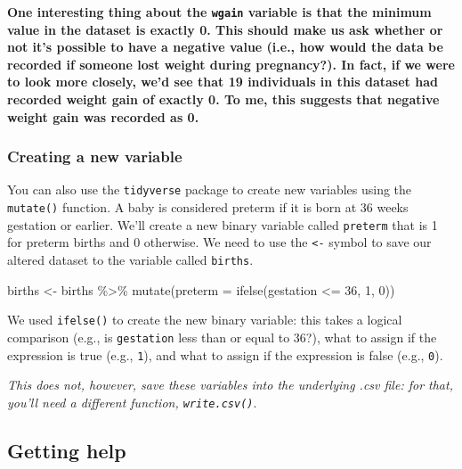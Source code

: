 \documentclass[
]{article}
\newenvironment{Shaded}{\begin{snugshade}}{\end{snugshade}}
\newcommand{\AttributeTok}[1]{\textcolor[rgb]{0.77,0.63,0.00}{#1}}
\newcommand{\DecValTok}[1]{\textcolor[rgb]{0.00,0.00,0.81}{#1}}
\newcommand{\FunctionTok}[1]{\textcolor[rgb]{0.00,0.00,0.00}{#1}}
\newcommand{\NormalTok}[1]{#1}
\newcommand{\OtherTok}[1]{\textcolor[rgb]{0.56,0.35,0.01}{#1}}
\newcommand{\SpecialCharTok}[1]{\textcolor[rgb]{0.00,0.00,0.00}{#1}}
\begin{document}
\textbf{One interesting thing about the \texttt{wgain} variable is that
the minimum value in the dataset is exactly 0. This should make us ask
whether or not it's possible to have a negative value (i.e., how would
the data be recorded if someone lost weight during pregnancy?). In fact,
if we were to look more closely, we'd see that 19 individuals in this
dataset had recorded weight gain of exactly 0. To me, this suggests that
negative weight gain was recorded as 0.}

\hypertarget{creating-a-new-variable}{%
\subsubsection{Creating a new variable}\label{creating-a-new-variable}}

You can also use the \texttt{tidyverse} package to create new variables
using the \texttt{mutate()} function. A baby is considered preterm if it
is born at 36 weeks gestation or earlier. We'll create a new binary
variable called \texttt{preterm} that is 1 for preterm births and 0
otherwise. We need to use the \texttt{\textless{}-} symbol to save our
altered dataset to the variable called \texttt{births}.

\begin{Shaded}
\begin{Highlighting}[]
\NormalTok{births }\OtherTok{\textless{}{-}}\NormalTok{ births }\SpecialCharTok{\%\textgreater{}\%} \FunctionTok{mutate}\NormalTok{(}\AttributeTok{preterm =} \FunctionTok{ifelse}\NormalTok{(gestation }\SpecialCharTok{\textless{}=} \DecValTok{36}\NormalTok{, }\DecValTok{1}\NormalTok{, }\DecValTok{0}\NormalTok{))}
\end{Highlighting}
\end{Shaded}

We used \texttt{ifelse()} to create the new binary variable: this takes
a logical comparison (e.g., is \texttt{gestation} less than or equal to
36?), what to assign if the expression is true (e.g., \texttt{1}), and
what to assign if the expression is false (e.g., \texttt{0}).

\emph{This does not, however, save these variables into the underlying
.csv file: for that, you'll need a different function,
\texttt{write.csv()}}.

\hypertarget{getting-help}{%
\subsection{Getting help}\label{getting-help}}
\end{document}
